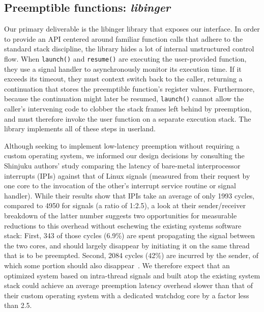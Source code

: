 \subsection{Preemptible functions: \textit{libinger}}
\label{sec:libinger}

Our primary deliverable is the libinger library that exposes our interface.  In order
to provide an API centered around familiar function calls that adhere to the standard
stack discipline, the library hides a lot of internal unstructured control flow.
When \texttt{launch()} and \texttt{resume()} are executing the user-provided
function, they use a signal handler to asynchronously monitor its execution time.  If
it exceeds its timeout, they must context switch back to the caller, returning a
continuation that stores the preemptible function's register values.  Furthermore,
because the continuation might later be resumed, \texttt{launch()} cannot allow the
caller's intervening code to clobber the stack frames left behind by preemption, and
must therefore invoke the user function on a separate execution stack.  The library
implements all of these steps in userland.

Although seeking to implement low-latency preemption without requiring a custom
operating system, we informed our design decisions by consulting the Shinjuku
authors' study comparing the latency of bare-metal interprocessor interrupts (IPIs)
against that of Linux signals (measured from their request by one core to the
invocation of the other's interrupt service routine or signal handler).  While their
results show that IPIs take an average of only 1993 cycles, compared to 4950 for
signals (a ratio of 1:2.5), a look at their sender/receiver breakdown of the latter
number suggests two opportunities for measurable reductions to this overhead without
eschewing the existing systems software stack:  First, 343 of those cycles (6.9\%)
are spent propagating the signal between the two cores, and should largely disappear
by initiating it on the same thread that is to be preempted.  Second, 2084 cycles
(42\%) are incurred by the sender, of which some portion should also
disappear~\cite{Kaffes:nsdi2019}.  We therefore expect that an optimized system based
on intra-thread signals and built atop the existing system stack could achieve an
average preemption latency overhead slower than that of their custom operating
system with a dedicated watchdog core by a factor less than 2.5.

